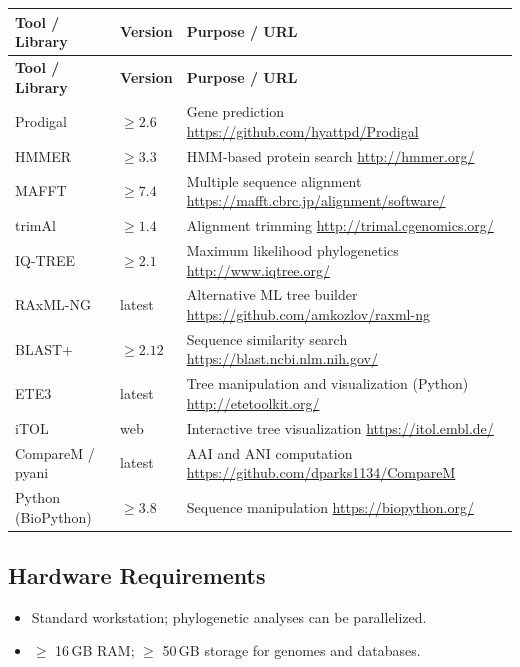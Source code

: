 \documentclass[11pt,a4paper]{article}
\begin{document}
\begin{longtable}{p{4.5cm} p{2.5cm} p{6.5cm}}
\toprule
\textbf{Tool / Library} & \textbf{Version} & \textbf{Purpose / URL} \\
\midrule
\endfirsthead
\toprule
\textbf{Tool / Library} & \textbf{Version} & \textbf{Purpose / URL} \\
\midrule
\endhead
Prodigal & $\geq 2.6$ & Gene prediction \newline \url{https://github.com/hyattpd/Prodigal} \\
\midrule
HMMER & $\geq 3.3$ & HMM-based protein search \newline \url{http://hmmer.org/} \\
\midrule
MAFFT & $\geq 7.4$ & Multiple sequence alignment \newline \url{https://mafft.cbrc.jp/alignment/software/} \\
\midrule
trimAl & $\geq 1.4$ & Alignment trimming \newline \url{http://trimal.cgenomics.org/} \\
\midrule
IQ-TREE & $\geq 2.1$ & Maximum likelihood phylogenetics \newline \url{http://www.iqtree.org/} \\
\midrule
RAxML-NG & latest & Alternative ML tree builder \newline \url{https://github.com/amkozlov/raxml-ng} \\
\midrule
BLAST+ & $\geq 2.12$ & Sequence similarity search \newline \url{https://blast.ncbi.nlm.nih.gov/} \\
\midrule
ETE3 & latest & Tree manipulation and visualization (Python) \newline \url{http://etetoolkit.org/} \\
\midrule
iTOL & web & Interactive tree visualization \newline \url{https://itol.embl.de/} \\
\midrule
CompareM / pyani & latest & AAI and ANI computation \newline \url{https://github.com/dparks1134/CompareM} \\
\midrule
Python (BioPython) & $\geq 3.8$ & Sequence manipulation \newline \url{https://biopython.org/} \\
\bottomrule
\end{longtable}

\subsection{Hardware Requirements}
\begin{itemize}
  \item Standard workstation; phylogenetic analyses can be parallelized.
  \item $\geq$ 16\,GB RAM; $\geq$ 50\,GB storage for genomes and databases.
\end{itemize}
\end{document}
